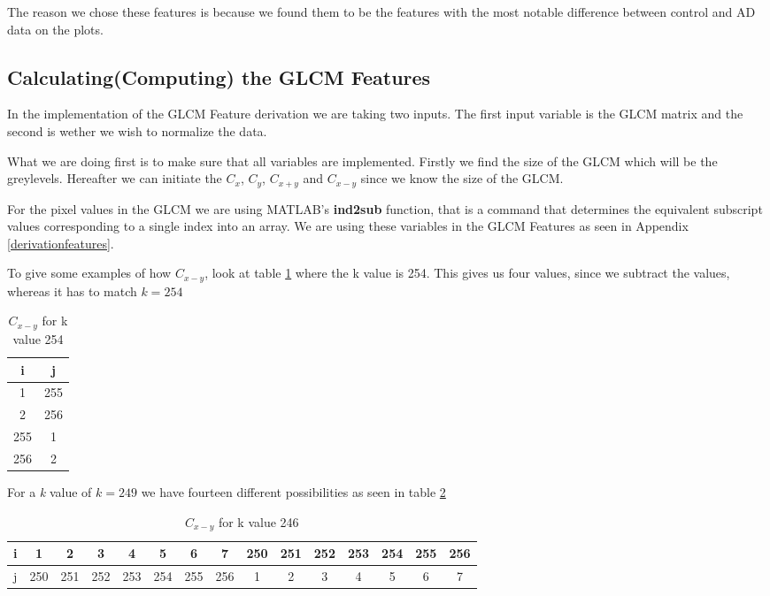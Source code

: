 The reason we chose these features is because we found them to be the features with the most notable difference between control and AD data on the plots.

\subsection{Calculating(Computing) the GLCM Features}

In the implementation of the GLCM Feature derivation we are taking two inputs. The first input variable is the GLCM matrix and the second is wether we wish to normalize the data.

What we are doing first is to make sure that all variables are implemented. Firstly we find the size of the GLCM which will be the greylevels. Hereafter we can initiate the $C_x$, $C_y$, $C_{x+y}$ and $C_{x-y}$ since we know the size of the GLCM.

For the pixel values in the GLCM we are using MATLAB's \textbf{ind2sub} function, that is a command that determines the equivalent subscript values corresponding to a single index into an array. We are using these variables in the GLCM Features as seen in Appendix \ref{derivationfeatures}.

To give some examples of how $C_{x-y}$, look at table \ref{tab:cxminusyk254} where the k value is 254. This gives us four values, since we subtract the values, whereas it has to match $k=254$

\begin{table}[H]
  \centering
    \begin{tabular}{|c|c|}
    \hline
    i & j \\
    \hline
    1     & 255 \\
    \hline
    2     & 256 \\
    \hline
    255   & 1 \\
    \hline
    256   & 2 \\
    \hline
    \end{tabular}%
  \caption{$C_{x-y}$ for k value 254}\label{tab:cxminusyk254}%
\end{table}%

For a \emph{k} value of $k=249$ we have fourteen different possibilities as seen in table \ref{tab:cxminusyk249}

\begin{table}[H]
  \centering
    \begin{tabular}{|c|c|c|c|c|c|c|c|c|c|c|c|c|c|c|}
    \hline
    i     & 1     & 2     & 3     & 4     & 5     & 6     & 7     & 250   & 251   & 252   & 253   & 254   & 255   & 256 \\
    \hline
    j     & 250   & 251   & 252   & 253   & 254   & 255   & 256   & 1     & 2     & 3     & 4     & 5     & 6     & 7 \\
    \hline
    \end{tabular}%
  \caption{$C_{x-y}$ for k value 246}\label{tab:cxminusyk249}%
\end{table}%

